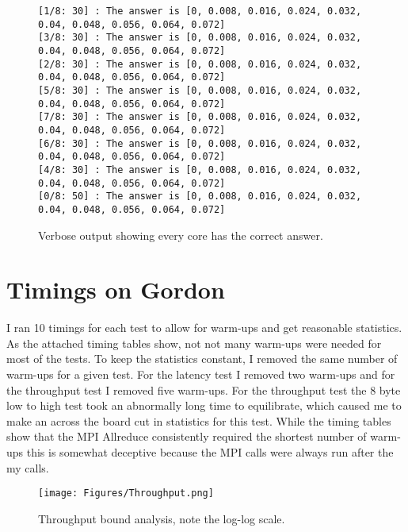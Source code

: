 \documentclass[11pt,a4paper,oneside]{report}
\begin{document}
\begin{figure}[htpb]
  \texttt{[1/8:  30] : The answer is [0, 0.008, 0.016, 0.024, 0.032, 0.04, 0.048, 0.056, 0.064, 0.072]\\}
  \texttt{[3/8:  30] : The answer is [0, 0.008, 0.016, 0.024, 0.032, 0.04, 0.048, 0.056, 0.064, 0.072]\\}
  \texttt{[2/8:  30] : The answer is [0, 0.008, 0.016, 0.024, 0.032, 0.04, 0.048, 0.056, 0.064, 0.072]\\}
  \texttt{[5/8:  30] : The answer is [0, 0.008, 0.016, 0.024, 0.032, 0.04, 0.048, 0.056, 0.064, 0.072]\\}
  \texttt{[7/8:  30] : The answer is [0, 0.008, 0.016, 0.024, 0.032, 0.04, 0.048, 0.056, 0.064, 0.072]\\}
  \texttt{[6/8:  30] : The answer is [0, 0.008, 0.016, 0.024, 0.032, 0.04, 0.048, 0.056, 0.064, 0.072]\\}
  \texttt{[4/8:  30] : The answer is [0, 0.008, 0.016, 0.024, 0.032, 0.04, 0.048, 0.056, 0.064, 0.072]\\}
  \texttt{[0/8:  50] : The answer is [0, 0.008, 0.016, 0.024, 0.032, 0.04, 0.048, 0.056, 0.064, 0.072]\\}
  \caption{Verbose output showing every core has the correct answer.}
  \label{fig:matchingcores}
\end{figure}
\pagebreak
\section{Timings on Gordon}

I ran 10 timings for each test to allow for warm-ups and get reasonable statistics.  As the attached timing tables show, not not many warm-ups were needed for most of the tests.  To keep the statistics constant, I removed the same number of warm-ups for a given test.  For the latency test I removed two warm-ups and for the throughput test I removed five warm-ups.  For the throughput test the 8 byte low to high test took an abnormally long time to equilibrate, which caused me to make an across the board cut in statistics for this test.  While the timing tables show that the MPI Allreduce consistently required the shortest number of warm-ups this is somewhat deceptive because the MPI calls were always run after the my calls.

\begin{figure}[htpb]
  \centering
  \texttt{[image: Figures/Throughput.png]}
  \caption{Throughput bound analysis, note the log-log scale.}
  \label{fig:throughput}
\end{figure}
\end{document}
